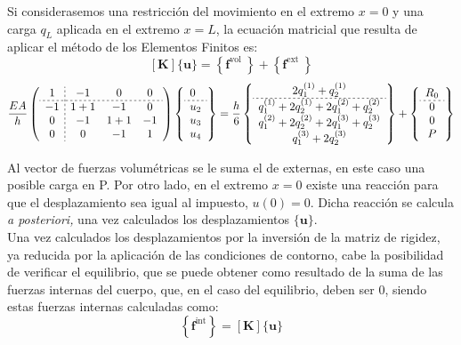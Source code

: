 \documentclass[spanish,a4paper,12pt]{article}
\begin{document}
Si considerasemos una restricción del movimiento en el extremo $x=0$ y una carga $q_L$ aplicada en el extremo $x=L$, la ecuación matricial que resulta de aplicar el método de los Elementos Finitos es:
$$
[\mathbf{K}]\{\mathbf{u}\}=\left\{\mathbf{f}^{\text {vol }}\right\}+\left\{\mathbf{f}^{\text {ext }}\right\}
$$
\begin{equation}\label{sistema}
\frac{EA}{h}\left(\begin{array}{c;{2pt/2pt}ccc}{1} & {-1} & {0} & {0} \\ 
\hdashline[2pt/2pt]
{-1} & {1+1} & {-1} & {0} \\ {0} & {-1} & {1+1} & {-1} \\ {0} & {0} & {-1} & {1}\end{array}\right)
\left\{\begin{array}{l}0\\
\hdashline[2pt/2pt]
u_2 \\ u_{3} \\ u_{4}\end{array}
\right\}=
\frac{h}{6}\left\{\begin{array}{c}{2q_1^{(1)}+q_2^{(1)}} \\ 
\hdashline[2pt/2pt]
{q_1^{(1)} + 2q_2^{(1)} + 2q_1^{(2)}+q_2^{(2)}} \\ {q_1^{(2)} + 2q_2^{(2)} + 2q_1^{(3)}+q_2^{(3)}}  \\ {q_1^{(3)} + 2q_2^{(3)}}\end{array}\right\}
+\left\{\begin{array}{c} R_0 \\
\hdashline[2pt/2pt]
{0} \\ {0} \\ {P}\end{array}\right\}
\end{equation}

\clearpage
 
 Al vector de fuerzas volumétricas se le suma el de externas, en este caso una posible carga en P. Por otro lado, en el extremo $x=0$ existe una reacción para que el desplazamiento sea igual al impuesto, $u(0)=0$. Dicha reacción se calcula \textit{a posteriori,} una vez calculados los desplazamientos $\{\mathbf{u}\}$. \\
 
Una vez calculados los desplazamientos por la inversión de la matriz de rigidez, ya reducida por la aplicación de las condiciones de contorno, cabe la posibilidad de verificar el equilibrio, que se puede obtener como resultado de la suma de las fuerzas internas del cuerpo, que, en el caso del equilibrio, deben ser 0, siendo estas fuerzas internas calculadas como:
 $$
\left\{\mathbf{f}^{\text {int}}\right\}=[\mathbf{K}]\{\mathbf{u}\}
$$
 
\end{document}
